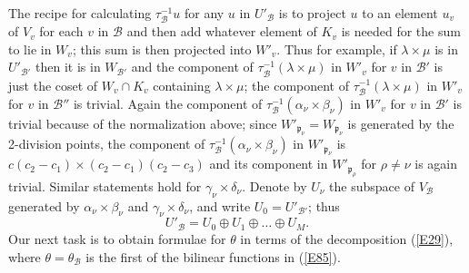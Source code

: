 \documentclass[12pt]{article}
\def\fp{{\mathfrak p}}
\def\ga{{\alpha}}
\def\gb{{\beta}}
\def\gg{{\gamma}}
\def\gd{{\delta}}
\def\gl{{\lambda}}
\def\gt{{\theta}}
\def\sB{{\mathcal B}}
\def\beq{\begin{equation} \label}
\begin{document}
The recipe for calculating $\tau^{-1}_\sB u$ for any $u$ in
$U'_\sB$ is to project $u$ to an element $u_v$ of $V_v$ for each $v$ in
$\sB$ and then add whatever
element of $K_v$ is needed for the sum to lie in $W_v$; this sum is then
projected into $W'_v$. Thus for example, if $\gl\times\mu$ is
in $U'_{\sB'}$ then it is in $W_{\sB'}$
and the component of $\tau^{-1}_\sB(\gl\times
\mu)$ in $W'_v$ for $v$ in $\sB'$ is just the coset of $W_v\cap K_v$
containing $\gl\times\mu$; the component of $\tau^{-1}_\sB(\gl\times
\mu)$ in $W'_v$ for $v$ in $\sB''$ is trivial. Again the component of
$\tau^{-1}_\sB(\ga_\nu
\times\gb_\nu)$ in $W'_v$ for $v$ in $\sB'$ is trivial because
of the normalization above; since $W'_{\fp_\nu}=W_{\fp_\nu}$
is generated by the 2-division points, the component
of $\tau^{-1}_\sB(\ga_\nu\times\gb_\nu)$ in $W'_{\fp_\nu}$ is $c(c_2-c_1)\times
(c_2-c_1)(c_2-c_3)$ and its component in $W'_{\fp_\rho}$
for $\rho\neq\nu$ is again trivial. Similar statements hold
for $\gg_\nu\times\gd_\nu$. Denote by $U_\nu$ the subspace of
$V_\sB$ generated by
$\ga_\nu\times\gb_\nu$ and $\gg_\nu\times\gd_\nu$, and write $U_0=U'_{\sB'}$;
thus
\beq{E29} U'_\sB=U_0\oplus U_1\oplus\ldots\oplus U_M. \end{equation}
Our next task is to obtain formulae for
$\gt$ in terms of the decomposition (\ref{E29}), where
$\gt=\gt_\sB$ is the first of the bilinear functions in
(\ref{E85}).
\end{document}
